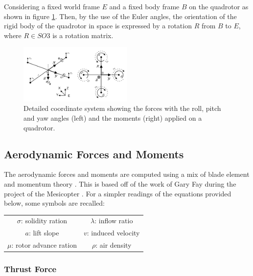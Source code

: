 \documentclass{thesisreport}
\begin{document}
Considering a fixed world frame $E$ and a fixed body frame $B$ on the quadrotor as shown in figure \ref{coordinate_system_detailed_quadrotor}. Then, by the use of the Euler angles, the orientation of the rigid body of the quadrotor in space is expressed by a rotation $R$ from $B$ to $E$, where $R \in SO3$ is a rotation matrix. 
 
 \begin{figure}[h]
\centering
\includegraphics[width=0.5\textwidth]{Images/Modeling/Detailed_quadrotor}
\caption{Detailed coordinate system showing the forces with the roll, pitch and yaw angles (left) and the moments (right) applied on a quadrotor. \cite{Bouabdalla2007}}
\label{coordinate_system_detailed_quadrotor}
\end{figure}
 
\newpage

\subsection{Aerodynamic Forces and Moments}

The aerodynamic forces and moments are computed using a mix of blade element and momentum theory \cite{Leishmana}. This is based off of the work of Gary Fay during the project of the Mesicopter \cite{Leishmanb}. For a simpler readings of the equations provided below, some symbols are recalled:

\begin{table}[h]
\centering
\setlength{\tabcolsep}{10pt} %
\renewcommand{\arraystretch}{1} %
\begin{tabular}{c c}
$\sigma$: solidity ration & $\lambda$: inflow ratio \\
$a$: lift slope & $v$: induced velocity \\
$\mu$: rotor advance ration & $\rho$: air density

\end{tabular}
\captionsetup[table]{list=no}
\end{table}
 
\subsubsection*{Thrust Force}
\end{document}
